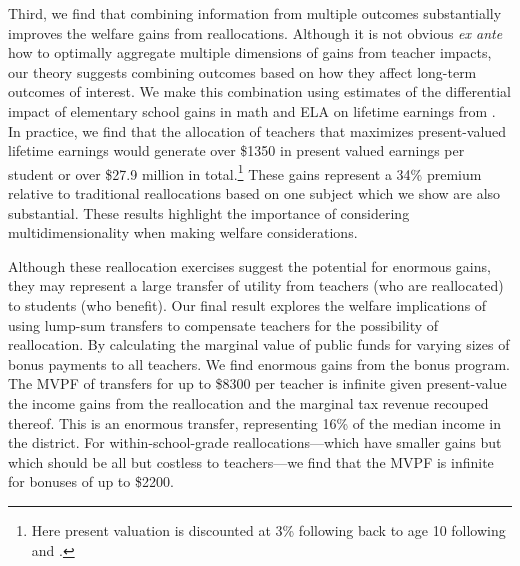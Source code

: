 \documentclass[12pt]{article}
\theoremstyle{definition}
\theoremstyle{definition}
\theoremstyle{definition}
\theoremstyle{definition}
\begin{document}
Third, we find that combining information from multiple outcomes substantially improves the welfare gains from reallocations. Although it is not obvious \textit{ex ante} how to optimally aggregate multiple dimensions of gains from teacher impacts, our theory suggests combining outcomes based on how they affect long-term outcomes of interest. We make this combination using estimates of the differential impact of elementary school gains in math and ELA on lifetime earnings from \citet{chetty2014measuring2}. In practice, we find that the allocation of teachers that maximizes present-valued lifetime earnings would generate over \$1350 in present valued earnings per student or over \$27.9 million in total.\footnote{Here present valuation is discounted at 3\% following back to age 10 following \citet{krueger1999experimental} and \citet{chetty2014measuring2}.} These gains represent a 34\% premium relative to traditional reallocations based on one subject \citep{Delgado2020,bates2022teacher} which we show are also substantial. These results highlight the importance of considering multidimensionality when making welfare considerations.


Although these reallocation exercises suggest the potential for enormous gains, they may represent a large transfer of utility from teachers (who are reallocated) to students (who benefit). Our final result explores the welfare implications of using lump-sum transfers to compensate teachers for the possibility of reallocation. By calculating the marginal value of public funds \citep[MVPF][]{Keyser_2020} for varying sizes of bonus payments to all teachers. We find enormous gains from the bonus program. The MVPF of transfers for up to \$8300 per teacher is infinite given present-value the income gains from the reallocation and the marginal tax revenue recouped thereof. This is an enormous transfer, representing 16\% of the median income in the district. For within-school-grade reallocations---which have smaller gains but which should be all but costless to teachers---we find that the MVPF is infinite for bonuses of up to \$2200. 
\end{document}
